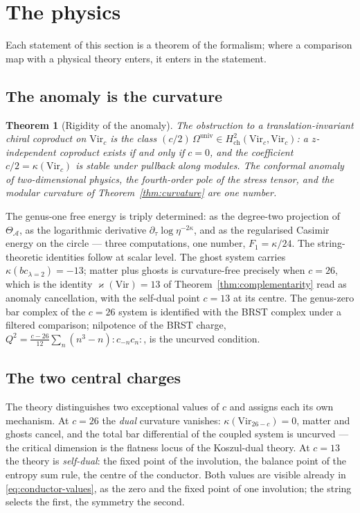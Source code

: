 \documentclass[11pt]{amsart}
\numberwithin{equation}{section}
\theoremstyle{plain}
\newtheorem{theorem}{Theorem}[section]
\theoremstyle{definition}
\theoremstyle{remark}
\newcommand{\cA}{\mathcal{A}}
\newcommand{\Vir}{\mathrm{Vir}}
\begin{document}
\section{The physics}\label{sec:physics}

Each statement of this section is a theorem of the formalism; where a
comparison map with a physical theory enters, it enters in the
statement.

\subsection{The anomaly is the curvature}

\begin{theorem}[Rigidity of the anomaly]\label{thm:anomaly}
The obstruction to a translation-invariant chiral coproduct on
$\Vir_c$ is the class $(c/2)\,\Omega^{\mathrm{univ}}
\in H^{2}_{\mathrm{ch}}(\Vir_c,\Vir_c)$: a $z$-independent coproduct
exists if and only if $c=0$, and the coefficient $c/2=\kappa(\Vir_c)$
is stable under pullback along modules. The conformal anomaly of
two-dimensional physics, the fourth-order pole of the stress tensor,
and the modular curvature of Theorem~\ref{thm:curvature} are one
number.
\end{theorem}

The genus-one free energy is triply determined: as the degree-two
projection of $\Theta_{\cA}$, as the logarithmic derivative
$\partial_\tau\log\eta^{-2\kappa}$, and as the regularised Casimir
energy on the circle --- three computations, one number,
$F_1=\kappa/24$. The string-theoretic identities follow at scalar
level. The ghost
system carries $\kappa(bc_{\lambda=2})=-13$; matter plus ghosts is
curvature-free precisely when $c=26$, which is the identity
$\varkappa(\Vir)=13$ of Theorem~\ref{thm:complementarity} read as
anomaly cancellation, with the self-dual point $c=13$ at its centre.
The genus-zero bar complex of the $c=26$ system is identified with the
BRST complex under a filtered comparison; nilpotence of the BRST
charge, $Q^{2}=\frac{c-26}{12}\sum_n(n^{3}-n):\!c_{-n}c_n\!:$, is the
uncurved condition.

\subsection{The two central charges}

The theory distinguishes two exceptional values of $c$ and assigns
each its own mechanism. At $c=26$ the \emph{dual} curvature vanishes:
$\kappa(\Vir_{26-c})=0$, matter and ghosts cancel, and the total bar
differential of the coupled system is uncurved --- the critical
dimension is the flatness locus of the Koszul-dual theory. At $c=13$
the theory is \emph{self-dual}: the fixed point of the involution,
the balance point of the entropy sum rule, the centre of the
conductor. Both values are visible already in
\eqref{eq:conductor-values}, as the zero and the fixed point of one
involution; the string selects the first, the symmetry the second.
\end{document}
